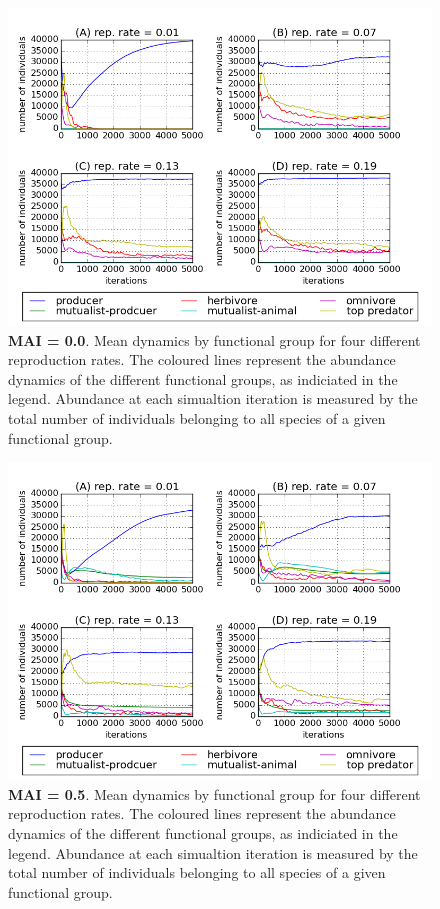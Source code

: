 \begin{figure}
	\centering
	\includegraphics[width=0.8\linewidth]{"figures/rr_mean_trophic_dynamics_mai00"}
	\caption{\textbf{MAI = 0.0}. Mean dynamics by functional group for four different reproduction rates. The coloured lines represent the abundance dynamics of the different functional groups, as indiciated in the legend. Abundance at each simualtion iteration is measured by the total number of individuals belonging to all species of a given functional group.}
	\label{fig:rr_mean_troph_dynamics_mai0}
\end{figure}

\begin{figure}
	\centering
	\includegraphics[width=0.8\linewidth]{"figures/rr_mean_trophic_dynamics_mai05"}
	\caption{\textbf{MAI = 0.5}. Mean dynamics by functional group for four different reproduction rates. The coloured lines represent the abundance dynamics of the different functional groups, as indiciated in the legend. Abundance at each simualtion iteration is measured by the total number of individuals belonging to all species of a given functional group.}
	\label{fig:rr_mean_troph_dynamics_mai05}
\end{figure}

